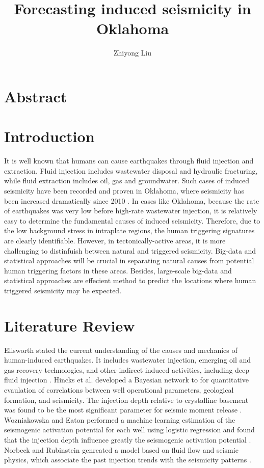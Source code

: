 \documentclass[project-plan]{report-template}
\title{Forecasting induced seismicity in Oklahoma}
\author{Zhiyong Liu}
\begin{document}
\maketitlepage  %
\githubrepo  %

\section*{Abstract}

\section{Introduction}
It is well known that humans can cause earthquakes through fluid injection and extraction.
Fluid injection includes wastewater disposal and hydraulic fracturing, while fluid extraction includes oil, gas and groundwater.
Such cases of induced seismicity have been recorded and proven in Oklahoma, where seismicity has been increased dramatically since 2010 \citep{ellsworth2013injection}.
In cases like Oklahoma, because the rate of earthquakes was very low before high-rate wastewater injection, it is relatively easy to determine the fundamental causes of induced seismicity.
Therefore, due to the low background stress in intraplate regions, the human triggering signatures are clearly identifiable.
However, in tectonically-active areas, it is more challenging to distinfuish between natural and triggered seismicity.
Big-data and statistical approaches will be crucial in separating natural causes from potential human triggering factors in these areas.
Besides, large-scale big-data and statistical approaches are effecient method to predict the locations where human triggered seismicity may be expected.

\section{Literature Review}
Ellsworth stated the current understanding of the causes and mechanics of human-induced earthquakes. It includes wastewater injection, emerging oil and gas recovery technologies, and other indirect induced activities,
including deep fluid injection \citep{ellsworth2013injection}.
Hincks et al. developed a Bayesian network to for quantitative evaulation of correlations between well operational parameters, geological formation, and seismicity.
The injection depth relative to crystalline basement was found to be the most significant parameter for seismic moment release \citep{hincks2018oklahoma}.
Wozniakowska and Eaton performed a machine learning estimation of the seismogenic activation potential for each well using logistic regression and found that the injection depth influence greatly the seismogenic activation potential \citep{wozniakowska2020machine}.
Norbeck and Rubinstein genreated a model based on fluid flow and seismic physics, which associate the past injection trends with the seismicity patterns \citep{norbeck2018hydromechanical}.
\end{document}
